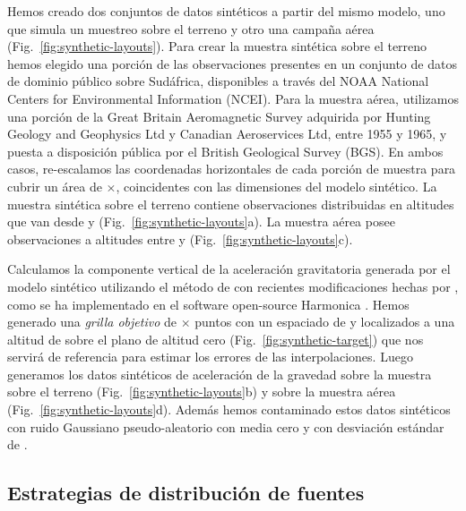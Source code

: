 Hemos creado dos conjuntos de datos sintéticos a partir del mismo modelo, uno
que simula un muestreo sobre el terreno y otro una campaña aérea
(Fig.~\ref{fig:synthetic-layouts}).
Para crear la muestra sintética sobre el terreno hemos elegido una porción de
las observaciones presentes en un conjunto de datos de dominio público sobre
Sudáfrica, disponibles a través del NOAA National Centers for Environmental
Information (NCEI). Para la muestra aérea, utilizamos una porción de la Great
Britain Aeromagnetic Survey adquirida por Hunting Geology and Geophysics Ltd
y Canadian Aeroservices Ltd, entre 1955 y 1965, y puesta a disposición pública
por el British Geological Survey (BGS).
En ambos casos, re-escalamos las coordenadas horizontales de cada porción de
muestra para cubrir un área de \SurveyEasting{}$\times$\SurveyNorthing{},
coincidentes con las dimensiones del modelo sintético.
La muestra sintética sobre el terreno contiene \GroundSurveyPoints{}
observaciones distribuidas en altitudes que van desde \GroundSurveyMinHeight{}
y \GroundSurveyMaxHeight{} (Fig.~\ref{fig:synthetic-layouts}a).
La muestra aérea posee \AirborneSurveyPoints{} observaciones a altitudes entre
\AirborneSurveyMinHeight{} y \AirborneSurveyMaxHeight{}
(Fig.~\ref{fig:synthetic-layouts}c).

Calculamos la componente vertical de la aceleración gravitatoria generada por
el modelo sintético utilizando el método de \citet{nagy2000, nagy2002} con
recientes modificaciones hechas por \citet{fukushima2020}, como se ha
implementado en el software open-source Harmonica \citep{harmonica2021}.
Hemos generado una \emph{grilla objetivo} de
\TargetEastingSize{}$\times$\TargetNorthingSize{} puntos con un espaciado de
\TargetSpacing{} y localizados a una altitud de \TargetHeight{} sobre el plano
de altitud cero (Fig.~\ref{fig:synthetic-target}) que nos servirá de referencia
para estimar los errores de las interpolaciones.
Luego generamos los datos sintéticos de aceleración de la gravedad sobre la
muestra sobre el terreno (Fig.~\ref{fig:synthetic-layouts}b) y sobre la muestra
aérea (Fig.~\ref{fig:synthetic-layouts}d).
Además hemos contaminado estos datos sintéticos con ruido Gaussiano
pseudo-aleatorio con media cero y con desviación estándar de \SurveyNoise{}.


\subsection{Estrategias de distribución de fuentes}
\label{sec:synthetic_distributions}

